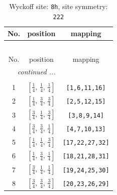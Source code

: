 \documentclass[fleqn,8pt]{jsarticle}
\begin{document}
\begin{longtable}{ccc}
\caption{Wyckoff site: {\tt 8h}, site symmetry: {\tt 222}}
 \\
 \hline \hline
No. & position & mapping \\ \hline \endfirsthead

\multicolumn{2}{l}{\tablename\ \thetable{}} \\
 \hline \hline
No. & position & mapping \\ \hline \endhead

 \hline \hline
\multicolumn{2}{r}{\footnotesize\it continued ...} \\ \endfoot

 \hline \hline
\multicolumn{2}{r}{} \\ \endlastfoot

1 & $\left[ \frac{1}{4},\, \frac{1}{4},\, \frac{1}{4} \right]$ & {\tt [1,6,11,16]} \\ \hline
2 & $\left[ \frac{1}{4},\, \frac{3}{4},\, \frac{3}{4} \right]$ & {\tt [2,5,12,15]} \\ \hline
3 & $\left[ \frac{3}{4},\, \frac{1}{4},\, \frac{3}{4} \right]$ & {\tt [3,8,9,14]} \\ \hline
4 & $\left[ \frac{3}{4},\, \frac{3}{4},\, \frac{1}{4} \right]$ & {\tt [4,7,10,13]} \\ \hline
5 & $\left[ \frac{1}{4},\, \frac{1}{4},\, \frac{3}{4} \right]$ & {\tt [17,22,27,32]} \\ \hline
6 & $\left[ \frac{1}{4},\, \frac{3}{4},\, \frac{1}{4} \right]$ & {\tt [18,21,28,31]} \\ \hline
7 & $\left[ \frac{3}{4},\, \frac{1}{4},\, \frac{1}{4} \right]$ & {\tt [19,24,25,30]} \\ \hline
8 & $\left[ \frac{3}{4},\, \frac{3}{4},\, \frac{3}{4} \right]$ & {\tt [20,23,26,29]} \\
\end{longtable}
\renewcommand{\arraystretch}{1.2}
\end{document}
